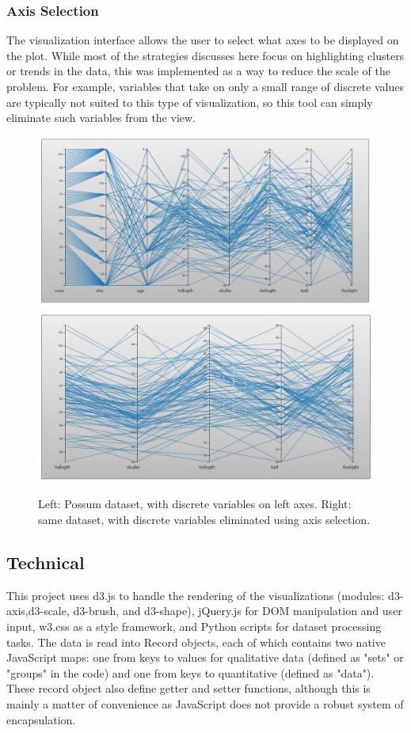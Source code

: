 \documentclass[]{article}
\begin{document}
		\subsubsection{Axis Selection}
		The visualization interface allows the user to select what axes to be displayed on the plot. While most of the strategies discusses here focus on highlighting clusters or trends in the data, this was implemented as a way to reduce the scale of the problem. For example, variables that take on only a small range of discrete values are typically not suited to this type of visualization\cite{kosara}, so this tool can simply eliminate such variables from the view.
		\begin{figure}[h]
			\includegraphics[width=\linewidth/2]{possum_bad.png}
			\includegraphics[width=\linewidth/2]{possum_good.png}
			\caption{Left: Possum dataset\cite{datasets}, with discrete variables on left axes. Right: same dataset, with discrete variables eliminated using axis selection.}
			\label{fig:Axis}
		\end{figure}
	\subsection{Technical}
		This project uses d3.js to handle the rendering of the visualizations (modules: d3-axis,d3-scale, d3-brush, and d3-shape), jQuery.js for DOM manipulation and user input, w3.css as a style framework, and Python scripts for dataset processing tasks. The data is read into Record objects, each of which contains two native JavaScript maps: one from keys to values for qualitative data (defined as "sets" or "groups" in the code) and one from keys to quantitative (defined as "data"). These record object also define getter and setter functions, although this is mainly a matter of convenience as JavaScript does not provide a robust system of encapsulation.
\end{document}

